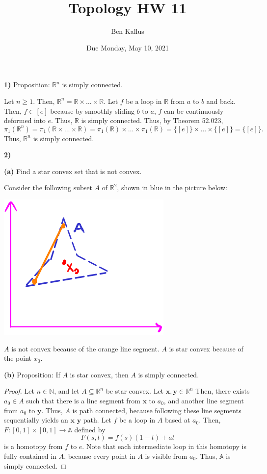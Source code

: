 \documentclass[12pt]{report}
\title{Topology HW 11}
\author{Ben Kallus}
\date{Due Monday, May 10, 2021}
\begin{document}
\maketitle

\medskip\noindent\textbf{1)} Proposition: $\mathbb R^n$ is simply connected.

    Let $n \geq 1$.
    Then, $\mathbb R^n = \mathbb R \times \hdots \times \mathbb R$.
    Let $f$ be a loop in $\mathbb R$ from $a$ to $b$ and back.
    Then, $f \in [e]$ because by smoothly sliding $b$ to $a$, $f$ can be continuously deformed into $e$.
    Thus, $\mathbb R$ is simply connected.
    Thus, by Theorem 52.023, $$\pi_1(\mathbb R^n) = \pi_1(\mathbb R \times \hdots \times \mathbb R) = \pi_1(\mathbb R) \times \hdots \times \pi_1(\mathbb R) = \{[e]\} \times \hdots \times \{[e]\} = \{[e]\}.$$
    Thus, $\mathbb R^n$ is simply connected.

\newpage\noindent\textbf{2)}

\medskip\noindent\textbf{(a)} Find a star convex set that is not convex.

Consider the following subset $A$ of $\mathbb R^2$, shown in blue in the picture below:
\begin{center} \includegraphics{1.png} \end{center}
$A$ is not convex because of the orange line segment.
$A$ is star convex because of the point $x_0$.

\medskip\noindent\textbf{(b)} Proposition: If $A$ is star convex, then $A$ is simply connected.
\begin{proof}
    Let $n \in \mathbb N$, and let $A \subseteq \mathbb R^n$ be star convex.
    Let $\mathbf x, \mathbf y \in \mathbb R^n$
    Then, there exists $a_0 \in A$ such that there is a line segment from $\mathbf x$ to $a_0$, and another line segment from $a_0$ to $\mathbf y$.
    Thus, $A$ is path connected, because following these line segments sequentially yields an $\mathbf x$ $\mathbf y$ path.
    Let $f$ be a loop in $A$ based at $a_0$.
    Then, $F: [0,1] \times [0,1] \to \mathbb A$ defined by $$F(s, t) = f(s)(1-t) + at$$ is a homotopy from $f$ to $e$.
    Note that each intermediate loop in this homotopy is fully contained in $A$, because every point in $A$ is visible from $a_0$.
    Thus, $\mathbb A$ is simply connected.
\end{proof}
\end{document}
